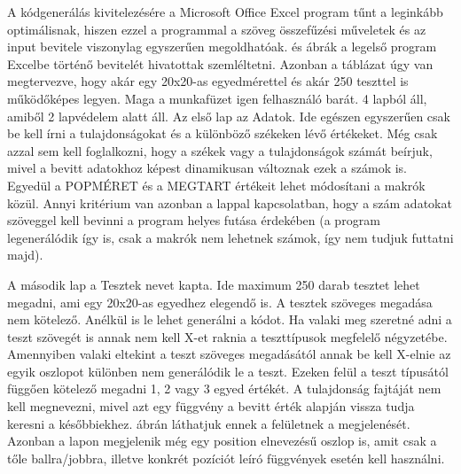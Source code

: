 \documentclass[12ppt,a4paper,oneside]{report}
\begin{document}
    
    A kódgenerálás kivitelezésére a Microsoft Office Excel program tűnt a leginkább optimálisnak, hiszen ezzel a programmal a szöveg összefűzési műveletek és az input bevitele viszonylag egyszerűen megoldhatóak.
     és  ábrák a legelső program Excelbe történő bevitelét hivatottak szemléltetni.
    Azonban a táblázat úgy van megtervezve, hogy akár egy 20x20-as egyedmérettel és akár 250 teszttel is működőképes legyen.
    Maga a munkafüzet igen felhasználó barát. 4 lapból áll, amiből 2 lapvédelem alatt áll.
    Az első lap az Adatok.
    Ide egészen egyszerűen csak be kell írni a tulajdonságokat és a különböző székeken lévő értékeket.
    Még csak azzal sem kell foglalkozni, hogy a székek vagy a tulajdonságok számát beírjuk, mivel a bevitt adatokhoz képest dinamikusan változnak ezek a számok is.
    Egyedül a POPMÉRET és a MEGTART értékeit lehet módosítani a makrók közül.
    Annyi kritérium van azonban a lappal kapcsolatban, hogy a szám adatokat szöveggel kell bevinni a program helyes futása érdekében (a program legenerálódik így is, csak a makrók nem lehetnek számok, így nem tudjuk futtatni majd).

    
      
    A második lap a Tesztek nevet kapta. Ide maximum 250 darab tesztet lehet megadni, ami egy 20x20-as egyedhez elegendő is.
    A tesztek szöveges megadása nem kötelező.
    Anélkül is le lehet generálni a kódot.
    Ha valaki meg szeretné adni a teszt szövegét is annak nem kell X-et raknia a teszttípusok megfelelő négyzetébe.
    Amennyiben valaki eltekint a teszt szöveges megadásától annak be kell X-elnie az egyik oszlopot különben nem generálódik le a teszt.
    Ezeken felül a teszt típusától függően kötelező megadni 1, 2 vagy 3 egyed értékét.
    A tulajdonság fajtáját nem kell megnevezni, mivel azt egy függvény a bevitt érték alapján vissza tudja keresni a későbbiekhez.
     ábrán láthatjuk ennek a felületnek a megjelenését.
    Azonban a lapon megjelenik még egy position elnevezésű oszlop is, amit csak a tőle ballra/jobbra, illetve konkrét pozíciót leíró függvények esetén kell használni.
    
\end{document}
